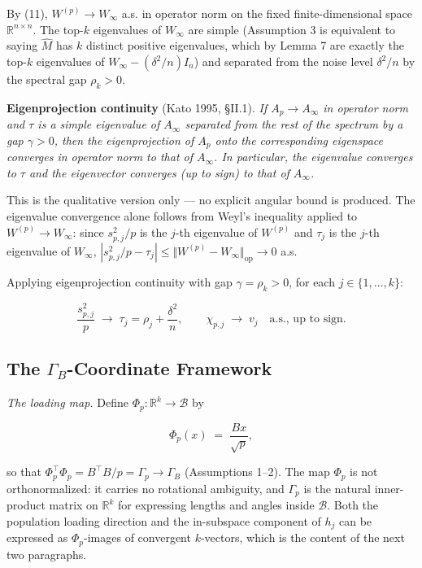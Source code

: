 \documentclass{article}
\theoremstyle{remark}
\begin{document}
By (11), $W^{(p)}\to W_\infty$ a.s. in operator norm on the fixed finite-dimensional space $\mathbb{R}^{n\times n}$. The top-$k$ eigenvalues of $W_\infty$ are simple (Assumption 3 is equivalent to saying $\hat{M}$ has $k$ distinct positive eigenvalues, which by Lemma 7 are exactly the top-$k$ eigenvalues of $W_\infty - (\delta^2/n)I_n$) and separated from the noise level $\delta^2/n$ by the spectral gap $\rho_k > 0$.

\textbf{Eigenprojection continuity} (Kato 1995, §II.1). \textit{If $A_p \to A_\infty$ in operator norm and $\tau$ is a simple eigenvalue of $A_\infty$ separated from the rest of the spectrum by a gap $\gamma > 0$, then the eigenprojection of $A_p$ onto the corresponding eigenspace converges in operator norm to that of $A_\infty$. In particular, the eigenvalue converges to $\tau$ and the eigenvector converges (up to sign) to that of $A_\infty$.}

This is the qualitative version only — no explicit angular bound is produced. The eigenvalue convergence alone follows from Weyl's inequality applied to $W^{(p)} \to W_\infty$: since $s_{p,j}^2/p$ is the $j$-th eigenvalue of $W^{(p)}$ and $\tau_j$ is the $j$-th eigenvalue of $W_\infty$, $|s_{p,j}^2/p - \tau_j| \le \Vert W^{(p)} - W_\infty\Vert_{\mathrm{op}} \to 0$ a.s.

Applying eigenprojection continuity with gap $\gamma = \rho_k > 0$, for each $j\in\{1,\ldots,k\}$:

\[
\frac{s_{p,j}^2}{p} \;\longrightarrow\; \tau_j = \rho_j + \frac{\delta^2}{n}, \qquad \chi_{p,j} \;\longrightarrow\; v_j \quad\text{a.s., up to sign.} \tag{13}
\]

\subsection{The $\Gamma_B$-Coordinate Framework}

\textit{The loading map.} Define $\Phi_p : \mathbb{R}^k \to \mathcal{B}$ by

\[
\Phi_p(x) \;=\; \frac{Bx}{\sqrt{p}},
\]

so that $\Phi_p^\top\Phi_p = B^\top B/p = \Gamma_p \to \Gamma_B$ (Assumptions 1–2). The map $\Phi_p$ is not orthonormalized: it carries no rotational ambiguity, and $\Gamma_p$ is the natural inner-product matrix on $\mathbb{R}^k$ for expressing lengths and angles inside $\mathcal{B}$. Both the population loading direction and the in-subspace component of $h_j$ can be expressed as $\Phi_p$-images of convergent $k$-vectors, which is the content of the next two paragraphs.
\end{document}
